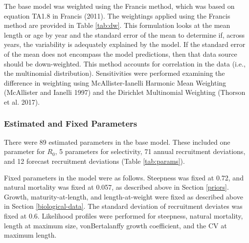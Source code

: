 \documentclass[11pt,
  english,
  a4paper,
]{article}
\begin{document}
\leavevmode\tagmcend\tagstructend\par


The base model was weighted using the Francis method, which was based on equation TA1.8 in Francis {(2011)\leavevmode\tagmcend\tagstructend}. The weightings applied using the Francis method are provided in Table \ref{tab:dw}. This formulation looks at the mean length or age by year and the standard error of the mean to determine if, across years, the variability is adequately explained by the model. If the standard error of the mean does not encompass the model predictions, then that data source should be down-weighted. This method accounts for correlation in the data (i.e., the multinomial distribution). Sensitivities were performed examining the difference in weighting using McAllister-Ianelli Harmonic Mean Weighting {(McAllister and Ianelli 1997)\leavevmode\tagmcend\tagstructend} and the Dirichlet Multinomial Weighting {(Thorson et al. 2017)\leavevmode\tagmcend\tagstructend}.

\leavevmode\tagmcend\tagstructend\par


\hypertarget{estimated-and-fixed-parameters}{%
\subsubsection{Estimated and Fixed Parameters}\label{estimated-and-fixed-parameters}}

\leavevmode\tagmcend\tagstructend


There were 89 estimated parameters in the base model. These included one parameter for {\(R_0\)\leavevmode\tagmcend\tagstructend}, 5 parameters for selectivity, 71 annual recruitment deviations, and 12 forecast recruitment deviations (Table \ref{tab:params}).

\leavevmode\tagmcend\tagstructend\par


Fixed parameters in the model were as follows. Steepness was fixed at 0.72, and natural mortality was fixed at 0.057, as described above in Section \ref{priors}. Growth, maturity-at-length, and length-at-weight were fixed as described above in Section \ref{biological-data}. The standard deviation of recruitment deviates was fixed at 0.6. Likelihood profiles were performed for steepness, natural mortality, length at maximum size, vonBertalanffy growth coefficient, and the CV at maximum length.
\end{document}
